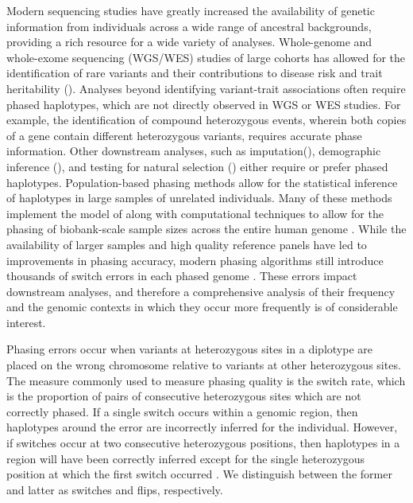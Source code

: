 Modern sequencing studies have greatly increased the availability of genetic information from individuals across a wide range of ancestral backgrounds, providing a rich resource for a wide variety of analyses. Whole-genome and whole-exome sequencing (WGS/WES) studies of large cohorts has allowed for the identification of rare variants and their contributions to disease risk and trait heritability (\citep{Wainschtein2022, Wang2021}). Analyses beyond identifying variant-trait associations often require phased haplotypes, which are not directly observed in WGS or WES studies. For example, the identification of compound heterozygous events, wherein both copies of a gene contain different heterozygous variants, requires accurate phase information. Other downstream analyses, such as imputation(\citep{Howie2012,Das2016,Das2018}), demographic inference (\citep{Maples2013,Baran2012,SalterTownshend2019}), and testing for natural selection (\citep{Browning2020NS, Sabeti2002, Hanchard2006, Zhang2006}) either require or prefer phased haplotypes. Population-based phasing methods allow for the statistical inference of haplotypes in large samples of unrelated individuals. Many of these methods implement the model of \cite{Li2003} along with computational techniques to allow for the phasing of biobank-scale sample sizes across the entire human genome \cite{Browning2021, Hofmeister2023, Loh2016}. While the availability of larger samples and high quality reference panels have led to improvements in phasing accuracy, modern phasing algorithms still introduce thousands of switch errors in each phased genome \cite{Choi2018}. These errors impact downstream analyses, and therefore a comprehensive analysis of their frequency and the genomic contexts in which they occur more frequently is of considerable interest.

Phasing errors occur when variants at heterozygous sites in a diplotype are placed on the wrong chromosome relative to variants at other heterozygous sites. The measure commonly used to measure phasing quality is the switch rate, which is the proportion of pairs of consecutive heterozygous sites which are not correctly phased. If a single switch occurs within a genomic region, then haplotypes around the error are incorrectly inferred for the individual. However, if switches occur at two consecutive heterozygous positions, then haplotypes in a region will have been correctly inferred except for the single heterozygous position at which the first switch occurred \citep{Browning2022}. We distinguish between the former and latter as switches and flips, respectively.

